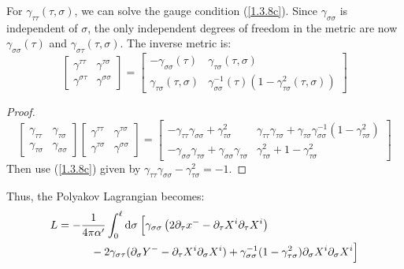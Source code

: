 For $\gamma_{\tau\tau}(\tau, \sigma)$, we can solve the gauge condition (\ref{1.3.8c}). Since $\gamma_{\sigma\sigma}$ is independent of $\sigma$, the only independent degrees of freedom in the metric are now $\gamma_{\sigma\sigma}(\tau)$ and $\gamma_{\sigma\tau}(\tau, \sigma)$. 
The inverse metric is: 
\begin{equation}
	\begin{bmatrix}
		\gamma^{\tau \tau} & \gamma^{\tau \sigma} \\
		\gamma^{\sigma \tau} & \gamma^{\sigma \sigma}
	\end{bmatrix}=
	\begin{bmatrix}
		-\gamma_{\sigma \sigma}(\tau) & \gamma_{\tau \sigma}(\tau, \sigma) \\
		\gamma_{\tau \sigma}(\tau, \sigma) & \gamma_{\sigma \sigma}^{-1}(\tau)\left(1-\gamma_{\tau \sigma}^{2}(\tau, \sigma)\right)
	\end{bmatrix}
\end{equation}
\begin{tcolorbox}[breakable]
	\begin{proof}
		\[
		\begin{bmatrix}
			\gamma_{\tau \tau} & \gamma_{\tau \sigma} \\
			\gamma_{\tau \sigma} & \gamma_{\sigma\sigma}
		\end{bmatrix}
		\begin{bmatrix}
			\gamma^{\tau\tau} & \gamma^{\tau \sigma} \\
			\gamma^{\tau \sigma} & \gamma^{\sigma \sigma}
		\end{bmatrix}
		=\begin{bmatrix}
			-\gamma_{\tau \tau} \gamma_{\sigma \sigma}+\gamma_{\tau \sigma}^{2} &  \gamma_{\tau\tau} \gamma_{\tau \sigma}+\gamma_{\tau \sigma} \gamma_{\sigma \sigma}^{-1}\left(1-\gamma_{\tau \sigma}^{2}\right) \\
			-\gamma_{\sigma \sigma} \gamma_{\tau \sigma}+\gamma_{\sigma \sigma} \gamma_{\tau \sigma} & \gamma_{\tau \sigma}^{2}+1-\gamma_{\tau \sigma}^{2}  
		\end{bmatrix}
		\]
		Then use (\ref{1.3.8c}) given by $\gamma_{\tau\tau} \gamma_{\sigma \sigma}-\gamma_{\tau \sigma}^{2}=-1$. 
	\end{proof} 
\end{tcolorbox}
\noindent Thus, the Polyakov Lagrangian becomes: 
\begin{equation}
	\begin{aligned}
		L&=-\frac{1}{4 \pi \alpha^{\prime}} \int_{0}^{\ell} \mathrm{d}\sigma\: \Bigl[\gamma_{\sigma \sigma}\left(2 \partial_{\tau} x^{-}-\partial_{\tau} X^{i} \partial_{\tau} X^{i}\right) \\
		&\qquad \quad-2 \gamma_{\sigma \tau}(\partial_{\sigma} Y^{-}-\partial_{\tau} X^{i} \partial_{\sigma} X^{i})
		+\gamma_{\sigma \sigma}^{-1}(1-\gamma_{\tau \sigma}^{2}) \partial_{\sigma} X^{i} \partial_{\sigma} X^{i}\Bigr]
	\end{aligned}
\end{equation}
